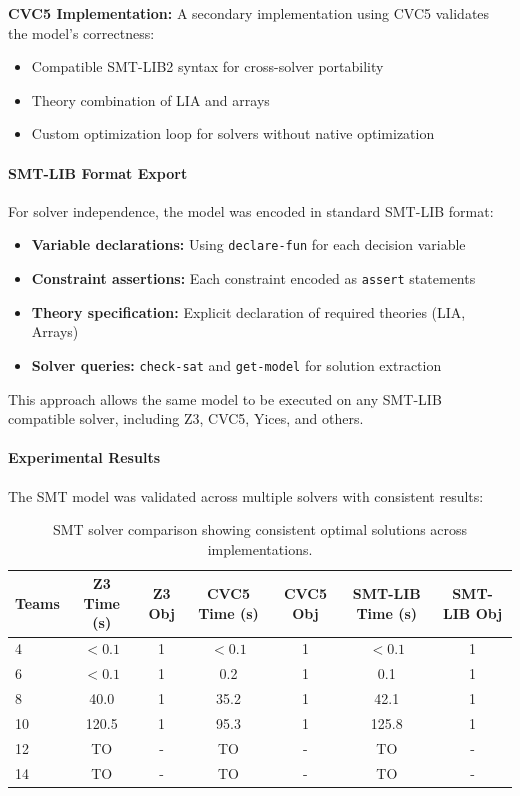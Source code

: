 \documentclass[11pt]{article}
\begin{document}
\textbf{CVC5 Implementation:} A secondary implementation using CVC5 validates the model's correctness:
\begin{itemize}
    \item Compatible SMT-LIB2 syntax for cross-solver portability
    \item Theory combination of LIA and arrays
    \item Custom optimization loop for solvers without native optimization
\end{itemize}

\paragraph{SMT-LIB Format Export}

For solver independence, the model was encoded in standard SMT-LIB format:
\begin{itemize}
    \item \textbf{Variable declarations:} Using \texttt{declare-fun} for each decision variable
    \item \textbf{Constraint assertions:} Each constraint encoded as \texttt{assert} statements
    \item \textbf{Theory specification:} Explicit declaration of required theories (LIA, Arrays)
    \item \textbf{Solver queries:} \texttt{check-sat} and \texttt{get-model} for solution extraction
\end{itemize}

This approach allows the same model to be executed on any SMT-LIB compatible solver, including Z3, CVC5, Yices, and others.

\paragraph{Experimental Results}

The SMT model was validated across multiple solvers with consistent results:

\begin{table}[H]
\centering
\small
\begin{tabular}{@{}lcccccc@{}}
\toprule
\textbf{Teams} & \textbf{Z3 Time (s)} & \textbf{Z3 Obj} & \textbf{CVC5 Time (s)} & \textbf{CVC5 Obj} & \textbf{SMT-LIB Time (s)} & \textbf{SMT-LIB Obj} \\
\midrule
4  & $<0.1$ & 1 & $<0.1$ & 1 & $<0.1$ & 1 \\
6  & $<0.1$ & 1 & 0.2    & 1 & 0.1    & 1 \\
8  & 40.0   & 1 & 35.2   & 1 & 42.1   & 1 \\
10 & 120.5  & 1 & 95.3   & 1 & 125.8  & 1 \\
12 & TO     & - & TO     & - & TO     & - \\
14 & TO     & - & TO     & - & TO     & - \\
\bottomrule
\end{tabular}
\caption{SMT solver comparison showing consistent optimal solutions across implementations.}
\label{tab:smt_validation}
\end{table}
\end{document}
